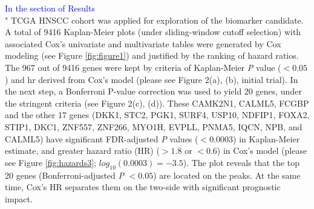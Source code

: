 \documentclass[preprint,12pt]{elsarticle}
\newenvironment{MyIndent}
{\par\leftskip1cm\relax\rightskip1cm\relax}
{\par\leftskip0cm\relax\rightskip0cm\relax}
\newenvironment{MyColorPar}[1]{%
    \leavevmode\color{#1}\ignorespaces%
}{%
}%
\begin{document}
\begin{MyColorPar}{blue}
\begin{MyIndent}
\begin{MyColorPar}{red}
\textcolor{blue}{In the section of Results}\\
"
TCGA HNSCC cohort was applied for exploration of the biomarker candidate.
A total of 9416 Kaplan-Meier plots (under sliding-window cutoff selection) with associated Cox's univariate and multivariate tables were generated by Cox modeling (see Figure \ref{fig:figure1}) and justified by the ranking of hazard ratios.
The 967 out of 9416 genes were kept by criteria of Kaplan-Meier \textit{P} value ($< 0.05$) and \acrfull{hr} derived from Cox's model (please see Figure 2(a), (b), initial trial).
In the next step, a Bonferroni P-value correction was used to yield 20 genes, under the stringent criteria (see Figure 2(c), (d)).
These CAMK2N1, CALML5, FCGBP and the other 17 genes (DKK1, STC2, PGK1, SURF4, USP10, NDFIP1, FOXA2, STIP1, DKC1, ZNF557, ZNF266, MYO1H, EVPLL, PNMA5, IQCN, NPB, and CALML5) have significant FDR-adjusted \textit{P} values ($< 0.0003$) in Kaplan-Meier estimate, and greater hazard ratio (HR) ($> 1.8$ or $< 0.6$) in Cox's model (please see Figure \ref{fig:hazards3}; $log_{10}(0.0003) = -3.5$).
The plot reveals that the top 20 genes (Bonferroni-adjusted \textit{P} $< 0.05$) are located on the peaks. At the same time, Cox's HR separates them on the two-side with significant prognostic impact.


\end{MyColorPar}
\end{MyIndent}
\end{MyColorPar}
\end{document}
